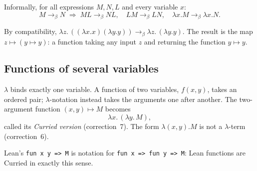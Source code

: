 \documentclass[11pt]{article}
\newcommand{\bred}{\to_\beta}
\begin{document}
\begin{quantified}
Informally, for all expressions $M, N, L$ and every variable $x$:
\[
M \bred N \;\Longrightarrow\;
ML \bred NL,\quad LM \bred LN,\quad \lambda x.M \bred \lambda x.N .
\]
\end{quantified}

\begin{example}
By compatibility, $\lambda z.\,((\lambda x.x)(\lambda y.y)) \bred
\lambda z.\,(\lambda y.y)$. The result is the map $z \mapsto (y \mapsto y)$:
a function taking any input $z$ and returning the function $y \mapsto y$.
\end{example}

\subsection{Functions of several variables}

\begin{remark}[Currying]\label{rem:currying}
$\lambda$ binds exactly one variable. A function of two variables,
$f(x,y)$, takes an ordered pair; $\lambda$-notation instead takes the
arguments one after another. The two-argument function $(x,y) \mapsto M$
becomes
\[
  \lambda x.\, (\lambda y.\, M),
\]
called its \emph{Curried version} (correction~7). The form
$\lambda(x,y).M$ is not a $\lambda$-term (correction~6).
\end{remark}

\begin{remark}[Lean]
Lean's \texttt{fun x y => M} is notation for
\texttt{fun x => fun y => M}: Lean functions are Curried in exactly this
sense.
\end{remark}
\end{document}
